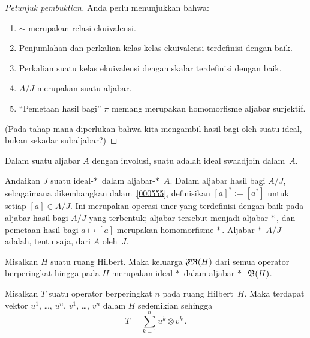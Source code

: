 \begin{proof}[\emph{Petunjuk pembuktian}] Anda perlu menunjukkan bahwa:
 \begin{enumerate}
  \item[(a)] $\sim$ merupakan relasi ekuivalensi.
  \item[(b)] Penjumlahan dan perkalian kelas-kelas ekuivalensi terdefinisi dengan baik.
  \item[(c)] Perkalian suatu kelas ekuivalensi dengan skalar terdefinisi dengan baik.
  \item[(d)] $A/J$ merupakan suatu aljabar.
  \item[(e)] ``Pemetaan hasil bagi'' $\pi$ memang merupakan homomorfisme aljabar surjektif.
 \end{enumerate}
(Pada tahap mana diperlukan bahwa kita mengambil hasil bagi oleh suatu ideal, bukan sekadar subaljabar?) \ns
\end{proof}

\begin{defn} Dalam suatu aljabar $A$ dengan involusi,
suatu  adalah ideal swaadjoin dalam~$A$.
\end{defn}

\begin{prop}\label{0010953} Andaikan $J$ suatu ideal-$*\,$ dalam aljabar-$*\,$ $A$. Dalam aljabar
hasil bagi $A/J$, sebagaimana dikembangkan dalam~\ref{000555}, definisikan $[a]^* := [a^*]$ untuk setiap $[a] \in A/J$.
Ini merupakan operasi uner yang terdefinisi dengan baik pada aljabar hasil bagi $A/J$ yang terbentuk; aljabar tersebut menjadi aljabar-$*\,$, dan
pemetaan hasil bagi $a \mapsto [a]$ merupakan homomorfisme-$*\,$. Aljabar-$*\,$ $A/J$ adalah, tentu
saja,
 dari $A$ oleh~$J$.
\end{prop}

\begin{prop} Misalkan $H$ suatu ruang Hilbert. Maka keluarga $\mathfrak{FR}(H)$ dari semua operator berperingkat hingga pada $H$
merupakan ideal-$*\,$ dalam aljabar-$*\,$~$\mathfrak{B}(H)$.
\end{prop}

\begin{prop}\label{prop_frop_sum_rnk1} Misalkan $T$ suatu operator berperingkat $n$ pada ruang Hilbert~$H$. Maka terdapat
vektor $u^1$, \dots, $u^n$, $v^1$, \dots, $v^n$ dalam $H$ sedemikian sehingga
   \[ T = \sum_{k=1}^n u^k \otimes v^k\,. \]
\end{prop}

